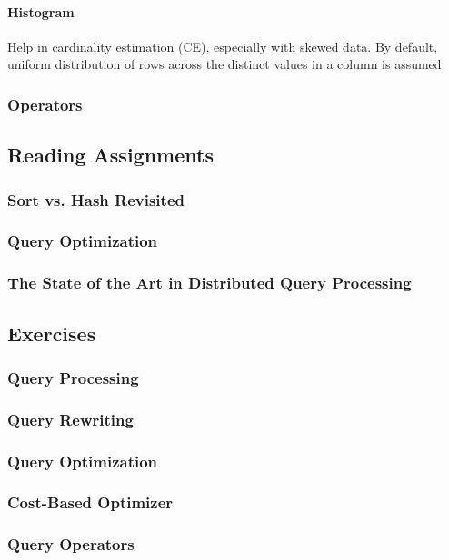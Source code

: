 \paragraph{Histogram}
Help in cardinality estimation (CE), especially with skewed data. By default, uniform distribution of rows across the distinct values in a column is assumed







\subsubsection{Operators}









\subsection{Reading Assignments}

\subsubsection{Sort vs. Hash Revisited}

\subsubsection{Query Optimization}

\subsubsection{The State of the Art in Distributed Query Processing}

\subsection{Exercises}

\subsubsection{Query Processing}

\subsubsection{Query Rewriting}

\subsubsection{Query Optimization}

\subsubsection{Cost-Based Optimizer}

\subsubsection{Query Operators}